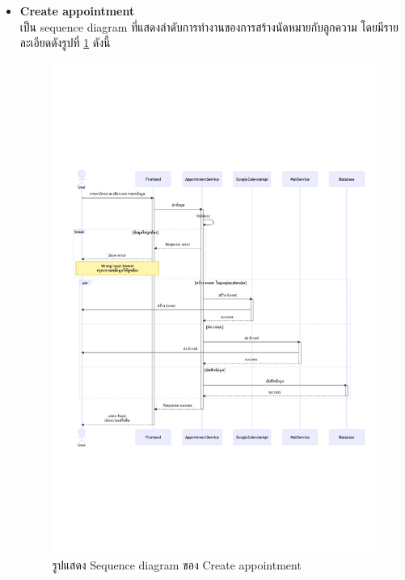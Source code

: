 \documentclass[12pt,oneside,openright,a4paper]{cpe-thai-project}
\begin{document}
\begin{itemize}
    \newpage
    \item \textbf{Create appointment} \\
    เป็น sequence diagram ที่แสดงลำดับการทำงานของการสร้างนัดหมายกับลูกความ โดยมีรายละเอียดดังรูปที่ \ref{fig:sqCreateEvent} ดังนี้
    \begin{figure}[!ht]\centering
        \includegraphics[width=15cm, trim={0 7cm 0 7cm},clip]{./assets/sequence-diagram/create-event.png}
        \caption{รูปแสดง Sequence diagram ของ Create appointment}\label{fig:sqCreateEvent}
    \end{figure}


\end{itemize}
\end{document}
